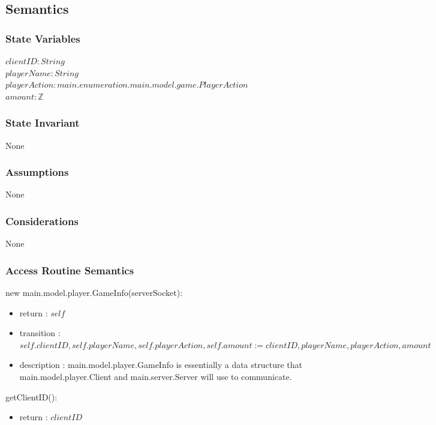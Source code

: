 \documentclass[12pt, titlepage]{article}
\begin{document}
    \subsection* {Semantics}
    
    \subsubsection* {State Variables}
        $\mathit{clientID}: String$\\
        $\mathit{playerName}: String$\\
        $\mathit{playerAction}: main.enumeration.main.model.game.PlayerAction$\\
        $\mathit{amount}: \mathbb{Z}$\\

    \subsubsection* {State Invariant}
        None
    
    \subsubsection* {Assumptions}
        None
    
    \subsubsection* {Considerations}
        None
    
    \subsubsection* {Access Routine Semantics}
    
        \noindent new main.model.player.GameInfo(serverSocket):
        \begin{itemize}
        \item return : $self$
        \item transition : $self.clientID, self.playerName, self.playerAction, self.amount := clientID, playerName, playerAction, amount$
        \item description : main.model.player.GameInfo is essentially a data structure that main.model.player.Client and main.server.Server will use to communicate.
        \end{itemize}
        
        \noindent getClientID():
        \begin{itemize}
        \item return : $clientID$
        \end{itemize}
        
\end{document}
